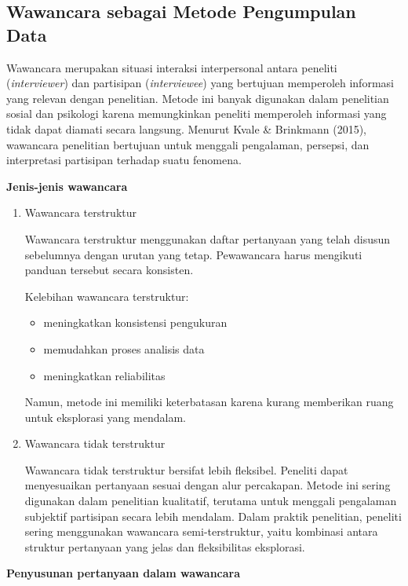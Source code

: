 \documentclass[
  indonesian,
  letterpaper,
  DIV=11,
  numbers=noendperiod]{scrreprt}
\providecommand{\tightlist}{%
  \setlength{\itemsep}{0pt}\setlength{\parskip}{0pt}}
\begin{document}
\subsection{Wawancara sebagai Metode Pengumpulan
Data}\label{wawancara-sebagai-metode-pengumpulan-data}

Wawancara merupakan situasi interaksi interpersonal antara peneliti
(\emph{interviewer}) dan partisipan (\emph{interviewee}) yang bertujuan
memperoleh informasi yang relevan dengan penelitian. Metode ini banyak
digunakan dalam penelitian sosial dan psikologi karena memungkinkan
peneliti memperoleh informasi yang tidak dapat diamati secara langsung.
Menurut Kvale \& Brinkmann (2015), wawancara penelitian bertujuan untuk
menggali pengalaman, persepsi, dan interpretasi partisipan terhadap
suatu fenomena.

\textbf{Jenis-jenis wawancara}

\begin{enumerate}
\def\labelenumi{\alph{enumi}.}
\item
  Wawancara terstruktur

  Wawancara terstruktur menggunakan daftar pertanyaan yang telah disusun
  sebelumnya dengan urutan yang tetap. Pewawancara harus mengikuti
  panduan tersebut secara konsisten.

  Kelebihan wawancara terstruktur:

  \begin{itemize}
  \tightlist
  \item
    meningkatkan konsistensi pengukuran
  \item
    memudahkan proses analisis data
  \item
    meningkatkan reliabilitas
  \end{itemize}

  Namun, metode ini memiliki keterbatasan karena kurang memberikan ruang
  untuk eksplorasi yang mendalam.
\item
  Wawancara tidak terstruktur

  Wawancara tidak terstruktur bersifat lebih fleksibel. Peneliti dapat
  menyesuaikan pertanyaan sesuai dengan alur percakapan. Metode ini
  sering digunakan dalam penelitian kualitatif, terutama untuk menggali
  pengalaman subjektif partisipan secara lebih mendalam. Dalam praktik
  penelitian, peneliti sering menggunakan wawancara semi-terstruktur,
  yaitu kombinasi antara struktur pertanyaan yang jelas dan
  fleksibilitas eksplorasi.
\end{enumerate}

\textbf{Penyusunan pertanyaan dalam wawancara}
\end{document}
